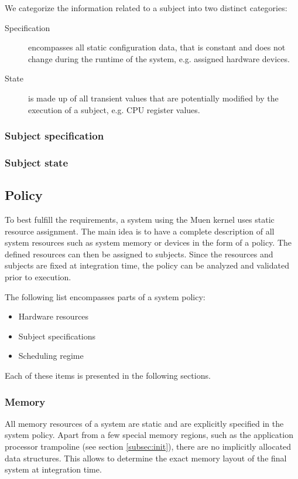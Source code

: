 We categorize the information related to a subject into two distinct categories:

\begin{description}
	\item[Specification] encompasses all static configuration data, that is
		constant and does not change during the runtime of the system, e.g.
		assigned hardware devices.
	\item[State] is made up of all transient values that are potentially modified
		by the execution of a subject, e.g. CPU register values.
\end{description}

\subsubsection{Subject specification}

\subsubsection{Subject state}

\subsection{Policy}
To best fulfill the requirements, a system using the Muen kernel uses static
resource assignment. The main idea is to have a complete description of all
system resources such as system memory or devices in the form of a policy. The
defined resources can then be assigned to subjects. Since the resources and
subjects are fixed at integration time, the policy can be analyzed and
validated prior to execution.

The following list encompasses parts of a system policy:
\begin{itemize}
	\item Hardware resources
	\item Subject specifications
	\item Scheduling regime
\end{itemize}

Each of these items is presented in the following sections.

\subsubsection{Memory}
All memory resources of a system are static and are explicitly specified in the
system policy. Apart from a few special memory regions, such as the application
processor trampoline (see section \ref{subsec:init}), there are no implicitly
allocated data structures. This allows to determine the exact memory layout of
the final system at integration time.

